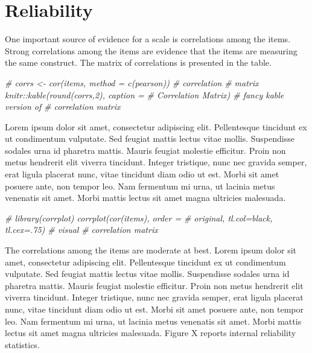 \documentclass[
]{report}
\newenvironment{Shaded}{\begin{snugshade}}{\end{snugshade}}
\newcommand{\CommentTok}[1]{\textcolor[rgb]{0.56,0.35,0.01}{\textit{#1}}}
\begin{document}
\hypertarget{reliability}{%
\chapter{Reliability}\label{reliability}}

One important source of evidence for a scale is correlations among the items. Strong correlations among the items are evidence that the items are measuring the same construct. The matrix of correlations is presented in the table.

\begin{Shaded}
\begin{Highlighting}[]
\CommentTok{\# corrs \textless{}{-} cor(items, method = c(\textquotesingle{}pearson\textquotesingle{})) \# correlation}
\CommentTok{\# matrix knitr::kable(round(corrs,2), caption =}
\CommentTok{\# \textquotesingle{}Correlation Matrix\textquotesingle{}) \# fancy kable version of}
\CommentTok{\# correlation matrix}
\end{Highlighting}
\end{Shaded}

Lorem ipsum dolor sit amet, consectetur adipiscing elit. Pellentesque tincidunt ex ut condimentum vulputate. Sed feugiat mattis lectus vitae mollis. Suspendisse sodales urna id pharetra mattis. Mauris feugiat molestie efficitur. Proin non metus hendrerit elit viverra tincidunt. Integer tristique, nunc nec gravida semper, erat ligula placerat nunc, vitae tincidunt diam odio ut est. Morbi sit amet posuere ante, non tempor leo. Nam fermentum mi urna, ut lacinia metus venenatis sit amet. Morbi mattis lectus sit amet magna ultricies malesuada.

\begin{Shaded}
\begin{Highlighting}[]
\CommentTok{\# library(corrplot) corrplot(cor(items), order =}
\CommentTok{\# \textquotesingle{}original\textquotesingle{}, tl.col=\textquotesingle{}black\textquotesingle{}, tl.cex=.75) \# visual}
\CommentTok{\# correlation matrix}
\end{Highlighting}
\end{Shaded}

The correlations among the items are moderate at best. Lorem ipsum dolor sit amet, consectetur adipiscing elit. Pellentesque tincidunt ex ut condimentum vulputate. Sed feugiat mattis lectus vitae mollis. Suspendisse sodales urna id pharetra mattis. Mauris feugiat molestie efficitur. Proin non metus hendrerit elit viverra tincidunt. Integer tristique, nunc nec gravida semper, erat ligula placerat nunc, vitae tincidunt diam odio ut est. Morbi sit amet posuere ante, non tempor leo. Nam fermentum mi urna, ut lacinia metus venenatis sit amet. Morbi mattis lectus sit amet magna ultricies malesuada.
Figure X reports internal reliability statistics.
\end{document}
